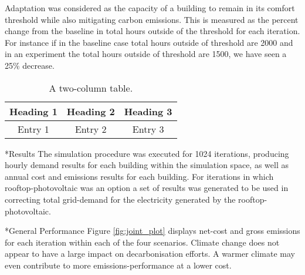 \documentclass[twocolumn, a4paper,10pt]{article}
\makeatletter
\renewcommand\section{\@startsection{section}{1}{\z@}{3pt}{3pt}{\normalfont\large\bfseries}}
\renewcommand\subsection{\@startsection{subsection}{1}{\z@}{\z@}{\z@}{\normalfont\normalsize\bfseries}}
\renewcommand\subsection{\@startsection{subsection}{1}{\z@}{\z@}{0.1pt}{\normalfont\normalsize\bfseries}}
\makeatother
\begin{document}
Adaptation was considered as the capacity of a building to remain in its comfort threshold while also mitigating carbon emissions. This is measured as the percent change from the baseline in total hours outside of the threshold for each iteration. For instance if in the baseline case total hours outside of threshold are 2000 and in an experiment the total hours outside of threshold are 1500, we have seen a 25\% decrease. 

\begin{table*}[h]
    \vspace{-5pt}   %
    \caption{A two-column table.}
    \label{tab:model_table}
    \centering
    \begin{tabular}{| c | c | c | }
        \hline
        \bf{Heading 1} & \bf{Heading} 2 & \bf{Heading 3} \\
        \hline
        Entry 1 & Entry 2 & Entry 3 \\
        \hline
    \end{tabular}
    \vspace{-5pt}   %
\end{table*}


\section*{Results}
The simulation procedure was executed for 1024 iterations, producing hourly demand results for each building within the simulation space, as well as annual cost and emissions results for each building. For iterations in which rooftop-photovoltaic was an option a set of results was generated to be used in correcting total grid-demand for the electricity generated by the rooftop-photovoltaic.  


\subsection*{General Performance}
Figure \ref{fig:joint_plot} displays net-cost and gross emissions for each iteration within each of the four scenarios. Climate change does not appear to have a large impact on decarbonisation efforts. A warmer climate may even contribute to more emissions-performance at a lower cost. 
\end{document}
